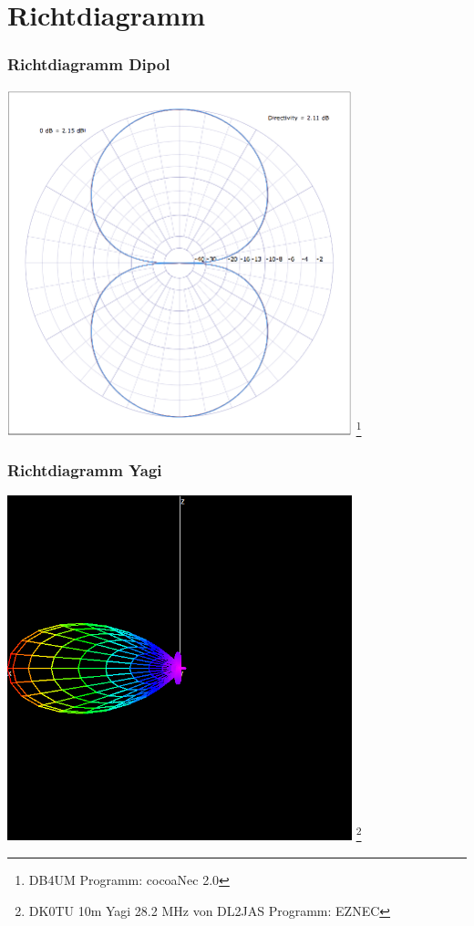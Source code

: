 \section*{Richtdiagramm}

\begin{frame}
    \frametitle{Richtdiagramm Dipol}
    \begin{center}
        \includegraphics[width=0.75\textwidth]{e11/Richt-Dipol.png}
        \footnote{\tiny DB4UM Programm: cocoaNec 2.0}
	\end{center}
\end{frame}

\begin{frame}
    \frametitle{Richtdiagramm Yagi}
    \begin{center}
        \includegraphics[width=0.75\textwidth]{e11/yagi_gain.png}
        \footnote{\tiny DK0TU 10m Yagi 28.2 MHz von DL2JAS Programm: EZNEC}
	\end{center}
\end{frame}

